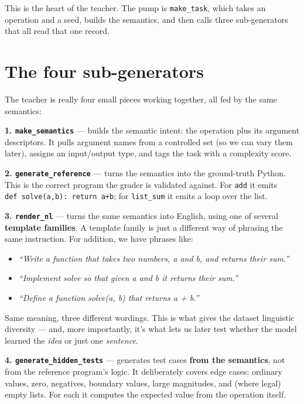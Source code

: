 This is the heart of the teacher. The pump is \texttt{make\_task}, which
takes an operation and a seed, builds the semantics, and then calls
three sub-generators that all read that one record.

\section{The four sub-generators}\label{the-four-sub-generators}

The teacher is really four small pieces working together, all fed by the
same semantics:

\textbf{1. \texttt{make\_semantics}} --- builds the semantic intent: the
operation plus its argument descriptors. It pulls argument names from a
controlled set (so we can vary them later), assigns an input/output
type, and tags the task with a complexity score.

\textbf{2. \texttt{generate\_reference}} --- turns the semantics into
the ground-truth Python. This is the correct program the grader is
validated against. For \texttt{add} it emits
\texttt{def\ solve(a,b):\ return\ a+b}; for \texttt{list\_sum} it emits
a loop over the list.

\textbf{3. \texttt{render\_nl}} --- turns the same semantics into
English, using one of several \textbf{template families}. A template
family is just a different way of phrasing the same instruction. For
addition, we have phrases like:

\begin{itemize}
\tightlist
\item
  \emph{``Write a function that takes two numbers, a and b, and returns
  their sum.''}
\item
  \emph{``Implement solve so that given a and b it returns their sum.''}
\item
  \emph{``Define a function solve(a, b) that returns a + b.''}
\end{itemize}

Same meaning, three different wordings. This is what gives the dataset
linguistic diversity --- and, more importantly, it's what lets us later
test whether the model learned the \emph{idea} or just one
\emph{sentence}.

\textbf{4. \texttt{generate\_hidden\_tests}} --- generates test cases
\textbf{from the semantics}, not from the reference program's logic. It
deliberately covers edge cases: ordinary values, zero, negatives,
boundary values, large magnitudes, and (where legal) empty lists. For
each it computes the expected value from the operation itself.

